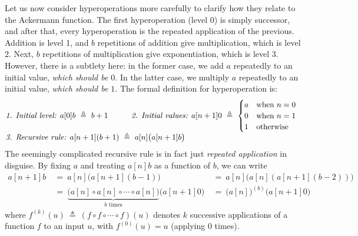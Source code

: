 Let us now consider hyperoperations more carefully
to clarify how they relate to the Ackermann function.
The first hyperoperation (level 0) is simply successor, and after that,
every hyperoperation is the repeated application of the previous.
Addition is level 1, and $b$ repetitions of addition
give multiplication, which is level 2. Next, $b$ repetitions of
multiplication give exponentiation, which is level 3. However,
there is a subtlety here: in the former case, we add $a$
repeatedly to an initial value, \emph{which should be $0$}.
In the latter case, we multiply $a$ repeatedly to an initial value,
\emph{which should be $1$}. The formal definition for hyperoperation is:
\begin{equation}
\label{eq:hyper}
\begin{array}{@{}l@{\qquad\quad}l}
\textit{1. Initial level: } a[0]b ~ \triangleq ~ b + 1 &
\textit{2. Initial values: } a[n+1]0 ~ \triangleq ~
\begin{cases}
a & \text{when } n = 0 \\
0 & \text{when } n = 1 \\
1 & \text{otherwise}
\end{cases}
\\
\multicolumn{2}{@{}l}{\textit{3. Recursive rule: } a[n+1](b+1) ~ \triangleq ~ a[n]\big(a[n+1]b\big)}
\end{array}
\end{equation}
The seemingly complicated recursive rule is in fact just \emph{repeated application} in disguise. By fixing $a$ and treating $a[n]b$ as a function of $b$, we can write
\begin{equation*}
\begin{array}{lll}
a[n+1]b & ~ = ~ a[n]\big(a[n+1](b-1)\big) & ~ = ~ a[n]\big(a[n](a[n+1](b-2))\big) \\
 & ~ = ~ \underbrace{\big( a[n]\circ a[n]\circ \cdots \circ a[n] \big)}_{b \text{ times}} \big(a[n+1]0\big) & ~ = ~ \big(a[n]\big)^{(b)}\big(a[n+1]0\big)
\end{array}
\end{equation*}
where $f^{(k)}(u) ~ \triangleq ~ (f\circ f\circ \cdots \circ f)(u)$ denotes $k$ successive applications of a function $f$ to an input $u$, with $f^{(0)}(u) = u $ (applying $0$ times).

